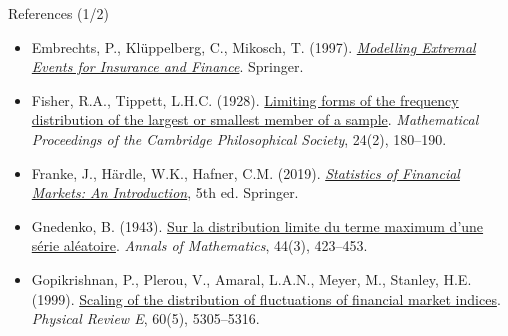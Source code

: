 \begin{frame}{References (1/2)}
\begin{itemize}
    \item Embrechts, P., Klüppelberg, C., Mikosch, T. (1997). \href{https://doi.org/10.1007/978-3-642-33483-2}{\textit{Modelling Extremal Events for Insurance and Finance}}. Springer.
    \item Fisher, R.A., Tippett, L.H.C. (1928). \href{https://doi.org/10.1017/S0305004100015681}{Limiting forms of the frequency distribution of the largest or smallest member of a sample}. \textit{Mathematical Proceedings of the Cambridge Philosophical Society}, 24(2), 180--190.
    \item Franke, J., Härdle, W.K., Hafner, C.M. (2019). \href{https://doi.org/10.1007/978-3-030-13751-9}{\textit{Statistics of Financial Markets: An Introduction}}, 5th ed. Springer.
    \item Gnedenko, B. (1943). \href{https://doi.org/10.2307/1968974}{Sur la distribution limite du terme maximum d'une série aléatoire}. \textit{Annals of Mathematics}, 44(3), 423--453.
    \item Gopikrishnan, P., Plerou, V., Amaral, L.A.N., Meyer, M., Stanley, H.E. (1999). \href{https://doi.org/10.1103/PhysRevE.60.5305}{Scaling of the distribution of fluctuations of financial market indices}. \textit{Physical Review E}, 60(5), 5305--5316.
\end{itemize}
\end{frame}

